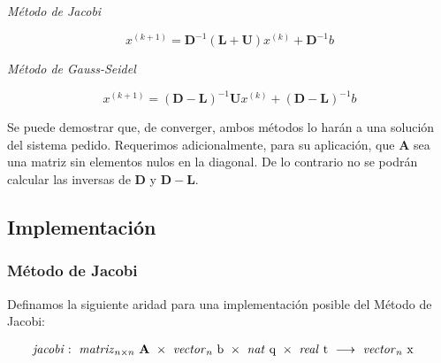 \vspace{1em}
\begin{center}
    \textit{Método de Jacobi}
\end{center}

\begin{equation} \label{jacobi}
    x^{(k+1)} = \textbf{D}^{-1} (\textbf{L} + \textbf{U}) x^{(k)} + \textbf{D}^{-1} b 
\end{equation}

\vspace{2em}
\begin{center}
    \textit{Método de Gauss-Seidel}
\end{center}

\begin{equation}\label{gauss-seidel}
    x^{(k+1)} = (\mathbf{D} - \mathbf{L})^{-1} \mathbf{U} x^{(k)} + (\mathbf{D} - \mathbf{L})^{-1} b
\end{equation}

\vspace{1em}
Se puede demostrar que, de converger, ambos métodos lo harán a una solución del sistema pedido. Requerimos adicionalmente, para su aplicación, que $\mathbf{A}$ sea una matriz sin elementos nulos en la diagonal. De lo contrario no se podrán calcular las inversas de $\mathbf{D}$ y $\mathbf{D} - \mathbf{L}$.






\vspace{2em}
\subsection{Implementación}

\vspace{2em}
\subsubsection{Método de Jacobi}
Definamos la siguiente aridad para una implementación posible del Método de Jacobi:

\begin{align*}
    \text{\textit{jacobi}}&:\ \text{\textit{matriz}}_{n \times n}\ \mathbf{A}\ \times\ \text{\textit{vector}}_n\ \text{b}\ \times\ \text{\textit{nat} q}\ \times\ \text{\textit{real} t}\
    \longrightarrow\ \text{\textit{vector}}_n\ \text{x}
\end{align*}


